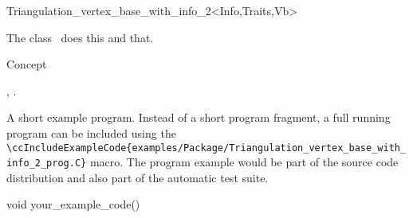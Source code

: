 

\begin{ccRefClass}{Triangulation_vertex_base_with_info_2<Info,Traits,Vb>}  %


\ccDefinition
  
The class \ccRefName\ does this and that.


\ccIsModel

Concept

\ccTypes


\ccCreation
{}  %


\ccOperations


\ccSeeAlso

,
.

\ccExample

A short example program.
Instead of a short program fragment, a full running program can be
included using the 
\verb|\ccIncludeExampleCode{examples/Package/Triangulation_vertex_base_with_info_2_prog.C}| 
macro. The program example would be part of the source code distribution and
also part of the automatic test suite.

\begin{ccExampleCode}
void your_example_code() {
}
\end{ccExampleCode}


\end{ccRefClass}


